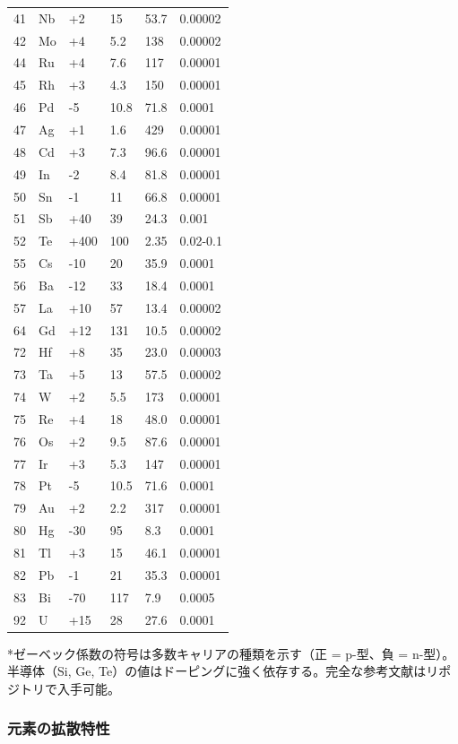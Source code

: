 \documentclass[11pt,a4paper]{article}
\theoremstyle{remark}
\begin{document}
\begin{longtable}{p{0.8cm}p{1.2cm}p{2.2cm}p{2.2cm}p{2.2cm}p{2.2cm}}
		41 & Nb & +2 & 15 & 53.7 & 0.00002 \\
		42 & Mo & +4 & 5.2 & 138 & 0.00002 \\
		44 & Ru & +4 & 7.6 & 117 & 0.00001 \\
		45 & Rh & +3 & 4.3 & 150 & 0.00001 \\
		46 & Pd & -5 & 10.8 & 71.8 & 0.0001 \\
		47 & Ag & +1 & 1.6 & 429 & 0.00001 \\
		48 & Cd & +3 & 7.3 & 96.6 & 0.00001 \\
		49 & In & -2 & 8.4 & 81.8 & 0.00001 \\
		50 & Sn & -1 & 11 & 66.8 & 0.00001 \\
		51 & Sb & +40 & 39 & 24.3 & 0.001 \\
		52 & Te & +400 & 100 & 2.35 & 0.02-0.1 \\
		55 & Cs & -10 & 20 & 35.9 & 0.0001 \\
		56 & Ba & -12 & 33 & 18.4 & 0.0001 \\
		57 & La & +10 & 57 & 13.4 & 0.00002 \\
		64 & Gd & +12 & 131 & 10.5 & 0.00002 \\
		72 & Hf & +8 & 35 & 23.0 & 0.00003 \\
		73 & Ta & +5 & 13 & 57.5 & 0.00002 \\
		74 & W  & +2 & 5.5 & 173 & 0.00001 \\
		75 & Re & +4 & 18 & 48.0 & 0.00001 \\
		76 & Os & +2 & 9.5 & 87.6 & 0.00001 \\
		77 & Ir & +3 & 5.3 & 147 & 0.00001 \\
		78 & Pt & -5 & 10.5 & 71.6 & 0.0001 \\
		79 & Au & +2 & 2.2 & 317 & 0.00001 \\
		80 & Hg & -30 & 95 & 8.3 & 0.0001 \\
		81 & Tl & +3 & 15 & 46.1 & 0.00001 \\
		82 & Pb & -1 & 21 & 35.3 & 0.00001 \\
		83 & Bi & -70 & 117 & 7.9 & 0.0005 \\
		92 & U  & +15 & 28 & 27.6 & 0.0001 \\
		\bottomrule
	\end{longtable}
	*ゼーベック係数の符号は多数キャリアの種類を示す（正 = p-型、負 = n-型）。半導体（Si, Ge, Te）の値はドーピングに強く依存する。完全な参考文献はリポジトリで入手可能。
	
	\subsubsection{元素の拡散特性}
	\label{subsec:diffusion-properties-func}
	
\end{document}
